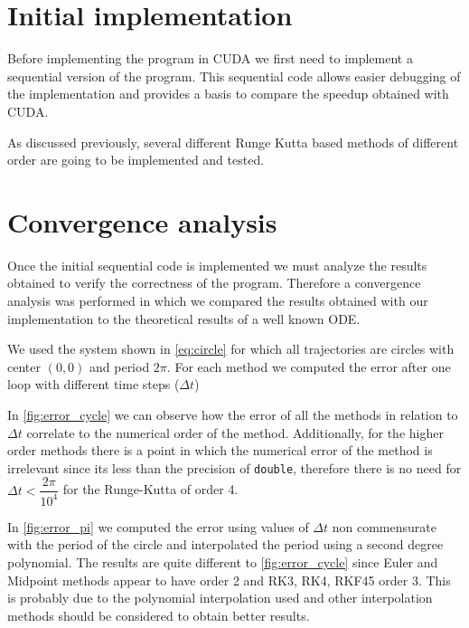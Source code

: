 
\section{Initial implementation}%
\label{sec:initial_implementation}

Before implementing the program in CUDA we first need to implement a sequential
version of the program. This sequential code allows easier debugging of the
implementation and provides a basis to compare the speedup obtained with CUDA.

As discussed previously, several different Runge Kutta based methods of different order
are going to be implemented and tested.



\section{Convergence analysis}%
\label{sec:convergence}

Once the initial sequential code is implemented we must analyze the results
obtained to verify the correctness of the program. Therefore a convergence
analysis was performed in which we compared the results obtained with our
implementation to the theoretical results of a well known ODE.

We used the system shown in \cref{eq:circle} for which all trajectories are
circles with center $(0,0)$ and period $2\pi$. For each method we computed the
error after one loop with different time steps ($\Delta t$)

In \cref{fig:error_cycle} we can observe how the error of all the methods
in relation to $\Delta t$ correlate to the numerical order of the method.
Additionally, for the higher order methods there is a point in which the
numerical error of the method is irrelevant since its less than the precision of
\texttt{double}, therefore there is no need for $\Delta t < \dfrac{2\pi}{10^4}$
for the Runge-Kutta of order 4.

In \cref{fig:error_pi} we computed the error using values of $\Delta t$ non commensurate
with the period of the circle and interpolated the period using a second degree
polynomial. The results are quite different to \cref{fig:error_cycle} since
Euler and Midpoint methods appear to have order 2 and RK3, RK4, RKF45 order 3.
This is probably due to the polynomial interpolation used and other
interpolation methods should be considered to obtain better results.

